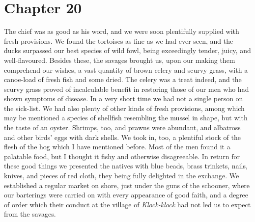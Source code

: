 \section{Chapter 20}
The chief was as good as his word, and we were soon plentifully supplied with
fresh provisions. We found the tortoises as fine as we had ever seen, and the
ducks surpassed our best species of wild fowl, being exceedingly tender, juicy,
and well-flavoured. Besides these, the savages brought us, upon our making them
comprehend our wishes, a vast quantity of brown celery and scurvy grass, with a
canoe-load of fresh fish and some dried. The celery was a treat indeed, and the
scurvy grass proved of incalculable benefit in restoring those of our men who
had shown symptoms of disease. In a very short time we had not a single person
on the sick-list. We had also plenty of other kinds of fresh provisions, among
which may be mentioned a species of shellfish resembling the mussel in shape,
but with the taste of an oyster. Shrimps, too, and prawns were abundant, and
albatross and other birds' eggs with dark shells. We took in, too, a plentiful
stock of the flesh of the hog which I have mentioned before. Most of the men
found it a palatable food, but I thought it fishy and otherwise disagreeable. In
return for these good things we presented the natives with blue beads, brass
trinkets, nails, knives, and pieces of red cloth, they being fully delighted in
the exchange. We established a regular market on shore, just under the guns of
the schooner, where our barterings were carried on with every appearance of good
faith, and a degree of order which their conduct at the village of
\emph{Klock-klock} had not led us to expect from the savages. 

